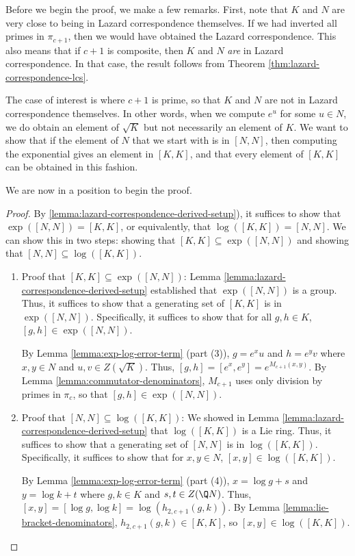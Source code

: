 \documentclass{ucetd}
\begin{document}
Before we begin the proof, we make a few remarks. First, note that $K$
and $N$ are very close to being in Lazard correspondence
themselves. If we had inverted all primes in $\pi_{c+1}$, then we
would have obtained the Lazard correspondence. This also means that if
$c + 1$ is composite, then $K$ and $N$ {\em are} in Lazard
correspondence. In that case, the result follows from Theorem
\ref{thm:lazard-correspondence-lcs}.

The case of interest is where $c + 1$ is prime, so that $K$ and $N$
are not in Lazard correspondence themselves. In other words, when we
compute $e^u$ for some $u \in N$, we do obtain an element of
$\sqrt{K}$ but not necessarily an element of $K$. We want to show that
if the element of $N$ that we start with is in $[N,N]$, then computing
the exponential gives an element in $[K,K]$, and that every element of
$[K,K]$ can be obtained in this fashion.

We are now in a position to begin the proof.

\begin{proof}
  By \ref{lemma:lazard-correspondence-derived-setup}), it suffices to
  show that $\exp([N,N]) = [K,K]$, or equivalently, that $\log([K,K])
  = [N,N]$. We can show this in two steps: showing that $[K,K]
  \subseteq \exp([N,N])$ and showing that $[N,N] \subseteq
  \log([K,K])$.

  \begin{enumerate}
  \item Proof that $[K,K] \subseteq \exp([N,N])$: Lemma
    \ref{lemma:lazard-correspondence-derived-setup} established that
    $\exp([N,N])$ is a group. Thus, it suffices to show that a
    generating set of $[K,K]$ is in $\exp([N,N])$. Specifically, it
    suffices to show that for all $g, h \in K$, $[g,h] \in
    \exp([N,N])$.

    By Lemma \ref{lemma:exp-log-error-term} (part (3)), $g = e^xu$ and
    $h = e^yv$ where $x,y \in N$ and $u,v \in Z(\sqrt{K})$. Thus,
    $[g,h] = [e^x,e^y] = e^{M_{c+1}(x,y)}$. By Lemma
    \ref{lemma:commutator-denominators}, $M_{c+1}$ uses only division
    by primes in $\pi_c$, so that $[g,h] \in \exp([N,N])$.

  \item Proof that $[N,N] \subseteq \log([K,K])$: We showed in Lemma
    \ref{lemma:lazard-correspondence-derived-setup} that $\log([K,K])$
    is a Lie ring. Thus, it suffices to show that a generating set of
    $[N,N]$ is in $\log([K,K])$.  Specifically, it suffices to show
    that for $x,y \in N$, $[x,y] \in \log([K,K])$.

    By Lemma \ref{lemma:exp-log-error-term} (part (4)), $x = \log g +
    s$ and $y = \log k + t$ where $g, k \in K$ and $s,t \in Z(\Q
    N)$. Thus, $[x,y] = [\log g, \log k] = \log(h_{2,c+1}(g,k))$. By
    Lemma \ref{lemma:lie-bracket-denominators}, $h_{2,c+1}(g,k) \in
    [K,K]$, so $[x,y] \in \log([K,K])$.
  \end{enumerate}
\end{proof}
\end{document}
